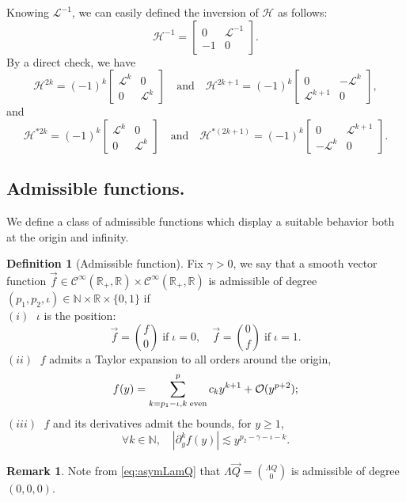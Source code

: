 \documentclass[11pt]{aims}
\theoremstyle{definition}
\newtheorem{definition}[theorem]{Definition}
\newtheorem{remark}[theorem]{Remark}
\numberwithin{equation}{section}
\begin{document}
Knowing ${\mathscr{L}}^{-1}$, we can easily defined the inversion of ${\mathscr{H}}$ as follows:
\begin{equation}
{\mathscr{H}}^{-1} = \begin{bmatrix}
0 & {\mathscr{L}}^{-1}\\ -1 & 0
\end{bmatrix}.
\end{equation}
By a direct check, we have 
\begin{equation}\label{def:H2k1}
{\mathscr{H}}^{2k} = (-1)^k \begin{bmatrix}
{\mathscr{L}}^k & 0 \\ 0 & {\mathscr{L}}^k
\end{bmatrix} \quad \text{and} \quad {\mathscr{H}}^{2k + 1} = (-1)^k \begin{bmatrix}
0 & - {\mathscr{L}}^k\\ {\mathscr{L}}^{k + 1} & 0
\end{bmatrix},
\end{equation}
and 
\begin{equation}\label{def:H2k1adj}
{\mathscr{H}}^{*2k} = (-1)^k \begin{bmatrix}
{\mathscr{L}}^k & 0 \\
0 & {\mathscr{L}}^k
\end{bmatrix} \quad \text{and} \quad {\mathscr{H}}^{*(2k + 1)} = (-1)^k \begin{bmatrix}
0 & {\mathscr{L}}^{k + 1}\\ - {\mathscr{L}}^k & 0
\end{bmatrix}.
\end{equation}

\subsection{Admissible functions.} We define a class of admissible functions which display a suitable behavior both at the origin and infinity.
\begin{definition}[Admissible function] \label{def:Admitfunc} Fix $\gamma > 0$, we say that a smooth vector function $\vec f \in  {\mathcal{C}}^\infty({\mathbb{R}}_+, {\mathbb{R}}) \times {\mathcal{C}}^\infty({\mathbb{R}}_+, {\mathbb{R}})$ is admissible of degree $(p_1, p_2, \iota) \in \mathbb{N} \times \mathbb{R} \times \{0,1\}$ if \\
$(i)\;$ $\iota$ is the position: 
$$\vec f = \binom{f}{0} \; \text{if}\; \iota = 0, \quad \vec{f} = \binom{0}{f} \; \text{if}\; \iota = 1.$$ 
$(ii)\;$ $f$ admits a Taylor expansion to all orders around the origin, 
 $$f(y) = \sum_{k = p_1 - \iota, k\; \textup{even}}^p c_ky^{k + 1} + {\mathcal{O}}(y^{p + 2});$$
$(iii)\;$ $f$ and its derivatives admit the bounds, for $y \geq 1$,
$$\forall k \in \mathbb{N}, \quad |\partial^k_y f(y)| \lesssim y^{p_2 - \gamma - \iota - k}.$$
\end{definition}
\begin{remark} Note from \eqref{eq:asymLamQ} that $\Lambda \vec Q = \binom{\Lambda Q}{0}$ is admissible of degree $(0,0, 0)$.
\end{remark}
\end{document}
